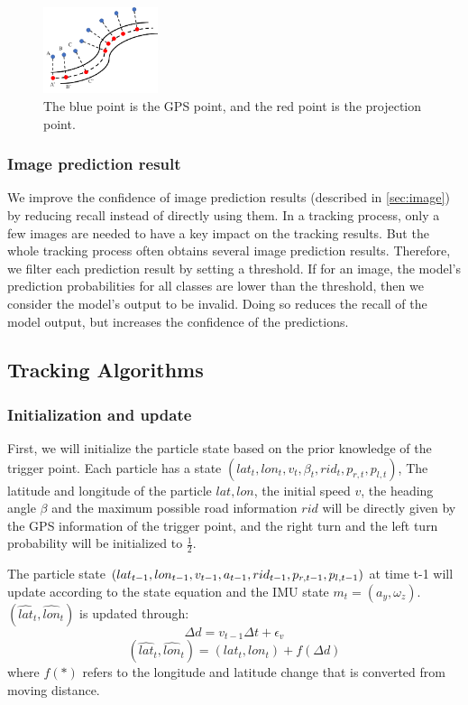 \documentclass[journal]{IEEEtran}
\begin{document}
\begin{figure}[htbp]
    \centerline{\includegraphics[width=0.3\textwidth]{fig/projection.pdf}}
    \caption{The blue point is the GPS point, and the red point is the projection point.}
    \label{fig:projection}
\end{figure}

\subsubsection{Image prediction result}
We improve the confidence of image prediction results (described in \ref{sec:image}) by reducing recall instead of directly using them. 
In a tracking process, only a few images are needed to have a key impact on the tracking results. But the whole tracking process often obtains several image prediction results. Therefore, we filter each prediction result by setting a threshold. If for an image, the model's prediction probabilities for all classes are lower than the threshold, then we consider the model's output to be invalid. Doing so reduces the recall of the model output, but increases the confidence of the predictions.


\subsection{Tracking Algorithms}

\subsubsection{Initialization and update}


First, we will initialize the particle state based on the prior knowledge of the trigger point. Each particle has a state $(lat_{t},lon_{t},v_{t},\beta_{t},rid_{t},p_{r,t},p_{l,t})$, The latitude and longitude of the particle $lat, lon$, the initial speed $v$, the heading angle $\beta$ and the maximum possible road information $rid$ will be directly given by the GPS information of the trigger point, and the right turn and the left turn probability will be initialized to $\frac{1}{2}$.


The particle state $(lat_{t-1},lon_{t-1},v_{t-1},a_{t-1},rid_{t-1},p_{r,t-1},\\
p_{l,t-1})$ at time t-1 will update according to the state equation and the IMU state $m_t=(a_y,\omega_z)$. $(\hat{lat}_t,\hat{lon}_t)$ is updated through:
\begin{equation}
\Delta{d} = v_{t-1}\Delta{t}+\epsilon_v
\end{equation}
\begin{equation}
(\hat{lat}_t, \hat{lon}_t) =(lat_{t},lon_{t})+f(\Delta d)
\end{equation}
where $f(*)$ refers to the longitude and latitude change that is converted from moving distance.
\end{document}
